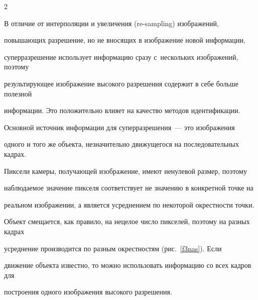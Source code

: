\begin{multicols}{2}
\begin{figure}
\begin{center}
\end{center}


\vspace*{-9pt}






      \end{figure}





     В отличие от интерполяции и увеличения (re-sampling) изображений,


повышающих разрешение, но не вносящих в изображение новой информации,


суперразрешение использует информацию сразу с~нескольких изображений, поэтому


резуль\-ти\-ру\-ющее изображение высокого разрешения содержит в себе больше полезной


информации. Это поло\-жительно влияет на качество методов идентификации.





     Основной источник информации для суперразрешения~--- это изображения


одного и того же объекта, незначительно движущегося на последовательных кадрах.


Пиксели камеры, получающей изоб\-ра\-же\-ние, имеют ненулевой размер, поэтому


наблюдаемое значение пикселя соответствует не значению в конкретной точке на


реальном изоб\-ра\-же\-нии, а является усреднением по некоторой окрестности точки.


Объект смещается, как правило, на нецелое число пикселей, поэтому на разных кадрах


усреднение производится по разным окрестностям (рис.~\ref{f3nas}). Если


движение объекта известно, то можно использовать информацию со всех кад\-ров для


построения одного изображения высокого разрешения.









\end{multicols}
